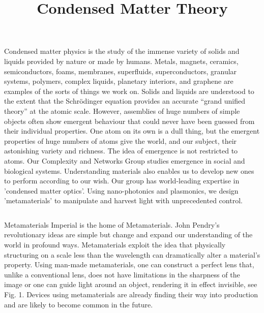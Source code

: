 \documentclass[xcolor={table}]{beamer}
\title{\Huge Condensed Matter Theory}
\begin{document}
\small
\begin{frame}[fragile=singleslide,t]\centering

\maketitle

\begin{tcolorbox}[colback=BackgroundBlue,colframe=ICDeepBlue,fontupper=\color{ICDeepBlue}]
\normalsize
    Condensed matter physics is the study of the immense variety of solids and
    liquids provided by nature or made by humans. Metals, magnets, ceramics,
    semiconductors, foams, membranes, superfluids, superconductors, granular
    systems, polymers, complex liquids, planetary interiors, and graphene are
    examples of the sorts of things we work on.
    Solids and liquids are understood to the extent that the Schrödinger equation
    provides an accurate “grand unified theory” at the atomic scale. However,
    assemblies of huge numbers of simple objects often show emergent behaviour that
    could never have been guessed from their individual properties. One atom on its
    own is a dull thing, but the emergent properties of huge numbers of atoms give
    the world, and our subject, their astonishing variety and richness. The idea of
    emergence is not restricted to atoms. Our Complexity and Networks Group studies
    emergence in social and biological systems.
    Understanding materials also enables us to develop new ones to perform according
    to our wish. Our group has world-leading expertise in 'condensed matter optics'.
    Using nano-photonics and plasmonics, we design 'metamaterials' to manipulate and
    harvest light with unprecedented control.

\end{tcolorbox}

\begin{columns}[onlytextwidth,T]

\begin{column}{.47\textwidth}

\begin{block}{Metamaterials}
Imperial is the home of Metamaterials. John Pendry's revolutionary ideas are
simple but change and expand our understanding of the world in profound ways.
Metamaterials exploit the idea that physically structuring on a scale less than
the wavelength can dramatically alter a material’s property. Using man-made
metamaterials, one can construct a perfect lens that, unlike a conventional
lens, does not have limitations in the sharpness of the image or one can guide
light around an object, rendering it in effect invisible, see Fig. 1. Devices
using metamaterials are already finding their way into production and are likely
to become common in the future.
\end{block}


\end{column}
\end{columns}
\end{frame}
\end{document}
